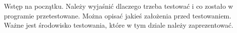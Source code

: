 Wstęp na początku. Należy wyjaśnić dlaczego trzeba testować i co zostało w programie przetestowane. Można opisać jakieś założenia przed testowaniem. Ważne jest środowisko testowania, które w tym dziale należy zaprezentować.

